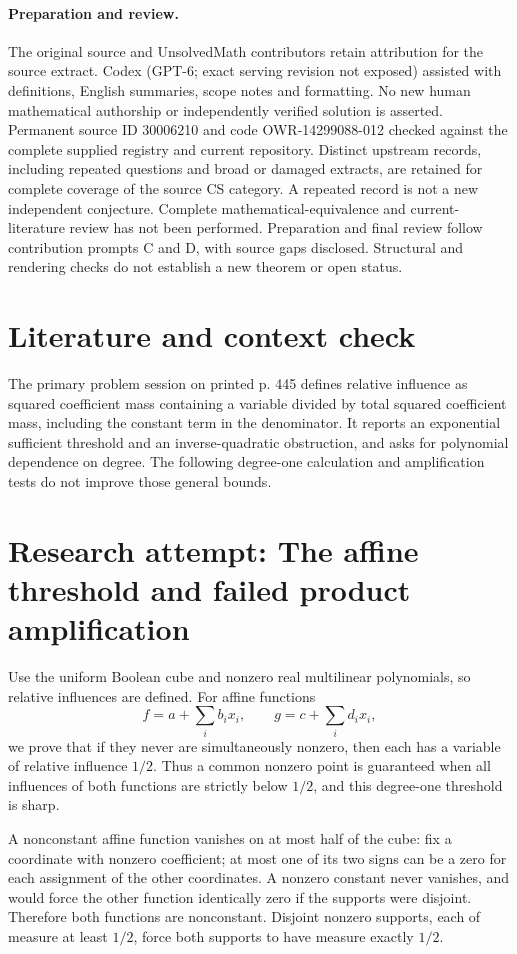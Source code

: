 \documentclass[11pt]{article}
\begin{document}
\paragraph{Preparation and review.}
The original source and UnsolvedMath contributors retain attribution for the source extract. Codex (GPT-6; exact serving revision not exposed) assisted with definitions, English summaries, scope notes and formatting. No new human mathematical authorship or independently verified solution is asserted. Permanent source ID 30006210 and code OWR-14299088-012 checked against the complete supplied registry and current repository. Distinct upstream records, including repeated questions and broad or damaged extracts, are retained for complete coverage of the source CS category. A repeated record is not a new independent conjecture. Complete mathematical-equivalence and current-literature review has not been performed. Preparation and final review follow contribution prompts C and D, with source gaps disclosed. Structural and rendering checks do not establish a new theorem or open status.
\label{end:30006210}

\section{Literature and context check}
The primary problem session on printed p. 445 defines relative influence as squared coefficient mass containing a variable divided by total squared coefficient mass, including the constant term in the denominator. It reports an exponential sufficient threshold and an inverse-quadratic obstruction, and asks for polynomial dependence on degree. The following degree-one calculation and amplification tests do not improve those general bounds.
\section{Research attempt: The affine threshold and failed product amplification}

Use the uniform Boolean cube and nonzero real multilinear polynomials, so relative influences are defined. For affine functions
\[
f=a+\sum_i b_i x_i,\qquad g=c+\sum_i d_i x_i,
\]
we prove that if they never are simultaneously nonzero, then each has a variable of relative influence $1/2$. Thus a common nonzero point is guaranteed when all influences of both functions are strictly below $1/2$, and this degree-one threshold is sharp.

A nonconstant affine function vanishes on at most half of the cube: fix a coordinate with nonzero coefficient; at most one of its two signs can be a zero for each assignment of the other coordinates. A nonzero constant never vanishes, and would force the other function identically zero if the supports were disjoint. Therefore both functions are nonconstant. Disjoint nonzero supports, each of measure at least $1/2$, force both supports to have measure exactly $1/2$.
\end{document}
